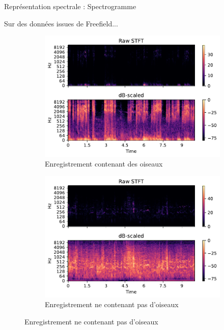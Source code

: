 \documentclass[compress,xcolor=table]{beamer}
\begin{document}
\begin{frame}{Représentation spectrale : Spectrogramme}

    Sur des données issues de Freefield...

    \begin{figure}[ht]
        \centering
        \begin{subfigure}[b]{0.45\textwidth}
            \centering
            \includegraphics[width=\textwidth]{images/audio/birds.spectrogram.ff1010.pdf}
            \caption{Enregistrement contenant des oiseaux}
            \label{fig:birds.spectrogram.ff1010}
        \end{subfigure}
        \hfill
        \begin{subfigure}[b]{0.45\textwidth}
            \centering
            \includegraphics[width=\textwidth]{images/audio/nobirds.spectrogram.ff1010.pdf}
            \caption{Enregistrement ne contenant pas d'oiseaux}
            \label{fig:nobirds.spectrogram.ff1010}
        \end{subfigure}
    \end{figure}

\end{frame}
\end{document}
